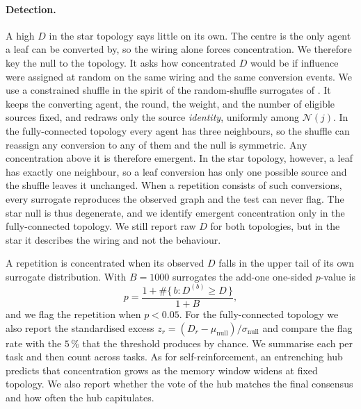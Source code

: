 \paragraph{Detection.}
A high $D$ in the star topology says little on its own. The centre is the only
agent a leaf can be converted by, so the wiring alone forces concentration. We
therefore key the null to the topology. It asks how concentrated $D$ would be if
influence were assigned at random on the same wiring and the same conversion
events. We use a constrained shuffle in the spirit of the random-shuffle surrogates of
\citet{theiler1992surrogate}. It keeps the converting agent, the round, the weight,
and the number of eligible sources fixed, and redraws only the source
\emph{identity}, uniformly among $\mathcal{N}(j)$.
In the fully-connected topology every agent has three neighbours, so the shuffle
can reassign any conversion to any of them and the null is symmetric. Any
concentration above it is therefore emergent. In the star topology, however, a
leaf has exactly one neighbour, so a leaf conversion has only one possible source
and the shuffle leaves it unchanged. When a repetition consists of such
conversions, every surrogate reproduces the observed graph and the test can never
flag. The star null is thus degenerate, and we identify emergent concentration only
in the fully-connected topology. We still report raw $D$ for both topologies, but
in the star it describes the wiring and not the behaviour.

A repetition is concentrated when its observed $D$ falls in the upper tail of its
own surrogate distribution. With $B = 1000$ surrogates the add-one one-sided
$p$-value is
\begin{equation}
  p = \frac{1 + \#\{\,b : D^{(b)} \geq D\,\}}{1 + B},
\end{equation}
and we flag the repetition when $p < 0.05$. For the fully-connected topology we
also report the standardised excess
$z_r = (D_r - \mu_{\mathrm{null}})/\sigma_{\mathrm{null}}$ and compare the flag
rate with the $5\,\%$ that the threshold produces by chance. We summarise each per
task and then count across tasks. As for self-reinforcement, an entrenching hub
predicts that concentration grows as the memory window widens at fixed topology.
We also report whether the vote of the hub matches the final consensus and how often the
hub capitulates.

